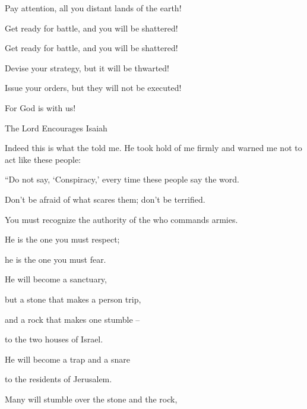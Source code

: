 {\par }{\Q Pay attention,
all
you distant
lands of the earth!
\par }{\Q Get ready
for battle, and you will be shattered!
\par }{\Q Get ready
for battle, and you will be shattered!
\par }{\Q {}Devise
your strategy,
but it will be thwarted!
\par }{\Q Issue
your orders,
but they will not
be executed!

\par }{\Q For
God
is with us!
\par }{\SH The Lord Encourages Isaiah
\par }{\PP {}Indeed
this is what
the {}
told
me. He took
hold of me firmly
and warned
me not to act
like these
people:
\par }{\Q {}“Do not
say,
‘Conspiracy,’
every
time these people
say
the word.

\par }{\Q Don’t be afraid
of what
scares
them; don’t be terrified.
\par }{\Q {}You must
recognize
the authority
of the {}
who commands armies.
\par }{\Q He is the one you must respect;
\par }{\Q he is the one you must fear.
\par }{\Q {}He will become
a sanctuary,
\par }{\Q but a stone
that makes a person trip,
\par }{\Q and a rock
that makes one stumble
–
\par }{\Q to the two
houses
of Israel.
\par }{\Q He will become a trap
and a snare
\par }{\Q to the residents
of Jerusalem.
\par }{\Q {}Many
will stumble
over the stone and the rock,

}
